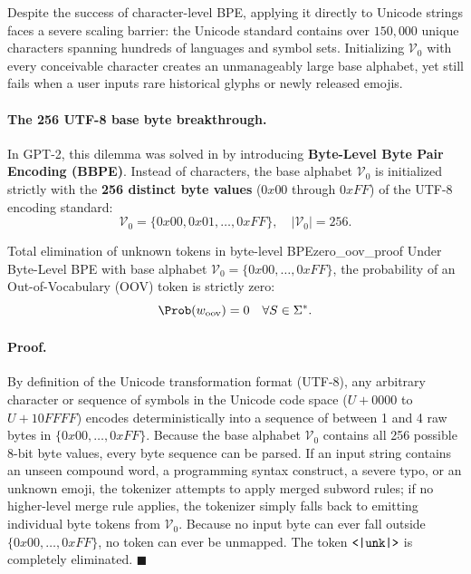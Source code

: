 \documentclass[../../main.tex]{subfiles}
\begin{document}
Despite the success of character-level BPE, applying it directly to Unicode strings faces a severe scaling barrier: the Unicode standard contains over $150{,}000$ unique characters spanning hundreds of languages and symbol sets. Initializing $\mathcal{V}_0$ with every conceivable character creates an unmanageably large base alphabet, yet still fails when a user inputs rare historical glyphs or newly released emojis.

\paragraph{The 256 UTF-8 base byte breakthrough.}
In GPT-2, this dilemma was solved in \cite{radford2019} by introducing \textbf{Byte-Level Byte Pair Encoding (BBPE)}. Instead of characters, the base alphabet $\mathcal{V}_0$ is initialized strictly with the \textbf{256 distinct byte values} ($0x00$ through $0xFF$) of the UTF-8 encoding standard:
\begin{equation}
\label{eq:byte_alphabet}
\mathcal{V}_0 = \{0x00, 0x01, \dots, 0xFF\}, \quad |\mathcal{V}_0| = 256.
\end{equation}

\begin{theorem}{Total elimination of unknown tokens in byte-level BPE}{zero_oov_proof}
Under Byte-Level BPE with base alphabet $\mathcal{V}_0 = \{0x00, \dots, 0xFF\}$, the probability of an Out-of-Vocabulary (OOV) token is strictly zero:
\begin{equation}
\label{eq:zero_oov_guarantee}
\Prob(w_{\text{oov}}) = 0 \quad \forall S \in \Sigma^*.
\end{equation}
\end{theorem}

\paragraph{Proof.}
By definition of the Unicode transformation format (UTF-8), any arbitrary character or sequence of symbols in the Unicode code space ($U+0000$ to $U+10FFFF$) encodes deterministically into a sequence of between 1 and 4 raw bytes in $\{0x00, \dots, 0xFF\}$.
Because the base alphabet $\mathcal{V}_0$ contains all 256 possible 8-bit byte values, every byte sequence can be parsed. If an input string contains an unseen compound word, a programming syntax construct, a severe typo, or an unknown emoji, the tokenizer attempts to apply merged subword rules; if no higher-level merge rule applies, the tokenizer simply falls back to emitting individual byte tokens from $\mathcal{V}_0$. Because no input byte can ever fall outside $\{0x00, \dots, 0xFF\}$, no token can ever be unmapped. The token $\text{\texttt{<|unk|>}}$ is completely eliminated. $\blacksquare$
\end{document}
